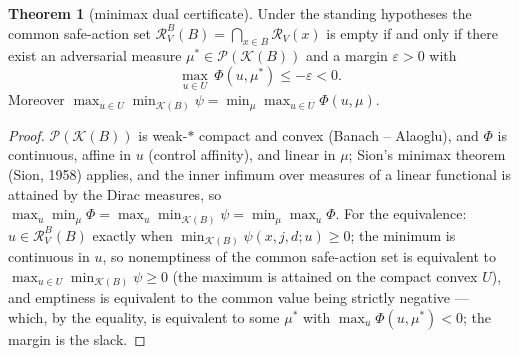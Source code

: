\documentclass[10pt,twocolumn]{article}
\theoremstyle{definition}
\newtheorem{theorem}{Theorem}
\begin{document}
\begin{theorem}[minimax dual certificate]\label{thm:dual}
Under the standing hypotheses the common safe-action set
$\mathcal{R}^{B}_{V}(B) = \bigcap_{x \in B}\mathcal{R}_{V}(x)$ is empty if
and only if there exist an adversarial measure
$\mu^{*} \in \mathscr{P}(\mathcal{K}(B))$ and a margin $\varepsilon > 0$
with
\begin{equation*}
\max_{u \in U}\,\Phi(u,\mu^{*}) \le -\varepsilon < 0.
\tag{$\star$}
\end{equation*}
Moreover
$\max_{u \in U}\min_{\mathcal{K}(B)}\psi
 = \min_{\mu}\max_{u \in U}\Phi(u,\mu)$.
\end{theorem}
\begin{proof}
$\mathscr{P}(\mathcal{K}(B))$ is weak-$*$ compact and convex (Banach --
Alaoglu), and $\Phi$ is continuous, affine in $u$ (control affinity), and
linear in $\mu$; Sion's minimax theorem (Sion, 1958) applies, and the inner infimum
over measures of a linear functional is attained by the Dirac measures,
so
$\max_{u}\min_{\mu}\Phi = \max_{u}\min_{\mathcal{K}(B)}\psi
 = \min_{\mu}\max_{u}\Phi$.
For the equivalence: $u \in \mathcal{R}^{B}_{V}(B)$ exactly when
$\min_{\mathcal{K}(B)}\psi(x,j,d;u) \ge 0$; the minimum is continuous in
$u$, so nonemptiness of the common safe-action set is equivalent to
$\max_{u \in U}\min_{\mathcal{K}(B)}\psi \ge 0$ (the maximum is attained
on the compact convex $U$), and emptiness is equivalent to the common
value being strictly negative --- which, by the equality, is equivalent to
some $\mu^{*}$ with $\max_{u}\Phi(u,\mu^{*}) < 0$; the margin is the
slack.
\end{proof}
\end{document}
